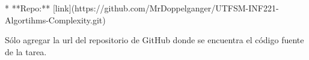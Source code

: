 \begin{mdframed}
    * **Repo:** [link](https://github.com/MrDoppelganger/UTFSM-INF221-Algortihms-Complexity.git) 
\end{mdframed}

Sólo agregar la url del repositorio de GitHub donde se encuentra el código fuente de la tarea. 